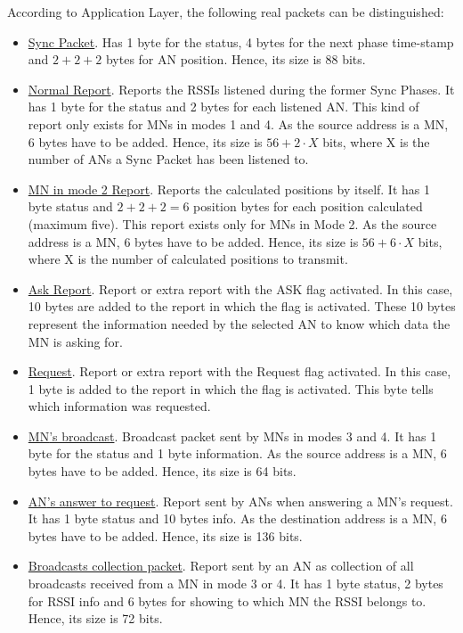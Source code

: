 According to Application Layer, the following real packets can be distinguished:
\begin{itemize}
 \item \underline{Sync Packet}. Has 1 byte for the status, 4 bytes for the next phase time-stamp and $2 + 2 + 2$ bytes for \ac{AN} position. 
Hence, its size is 88 bits.
 
 \item \underline{Normal Report}. Reports the \acp{RSSI} listened during the former Sync Phases. It has 1 byte for the status and 2 bytes 
for each listened \ac{AN}. This kind of report only exists for \acp{MN} in modes 1 and 4. As the source address is a \ac{MN}, 6 bytes have to be added.
Hence, its size is $56 + 2\cdot X$ bits, where X is the number of \acp{AN} a Sync Packet has been listened to.

 \item \underline{\ac{MN} in mode 2 Report}. Reports the calculated positions by itself. It has 1 byte status and $2 + 2 + 2 = 6$ position 
bytes for each position calculated (maximum five). This report exists only for \acp{MN} in Mode 2. As the source address is a \ac{MN}, 6 bytes 
have to be added. Hence, its size is $56 + 6\cdot X$ bits, where X is the number of calculated positions to transmit.

 \item \underline{Ask Report}. Report or extra report with the ASK flag activated. In this case, 10 bytes are added to the report in which the
flag is activated. These 10 bytes represent the information needed by the selected \ac{AN} to know which data the \ac{MN} is asking for.

 \item \underline{Request}. Report or extra report with the Request flag activated. In this case, 1 byte is added to the report in which the
flag is activated. This byte tells which information was requested.

 \item \underline{\ac{MN}'s broadcast}. Broadcast packet sent by \acp{MN} in modes 3 and 4. It has 1 byte for the status and 1 byte information.
As the source address is a \ac{MN}, 6 bytes have to be added. Hence, its size is 64 bits.

 \item \underline{\ac{AN}'s answer to request}. Report sent by \acp{AN} when answering a \ac{MN}'s request. It has 1 byte status and 10 bytes info.
As the destination address is a \ac{MN}, 6 bytes have to be added. Hence, its size is 136 bits.

 \item \underline{Broadcasts collection packet}. Report sent by an \ac{AN} as collection of all broadcasts received from a \ac{MN} in mode 3 
or 4. It has 1 byte status, 2 bytes for \ac{RSSI} info and 6 bytes for showing to which \ac{MN} the \ac{RSSI} belongs to. Hence, its size is 72 bits.
\end{itemize}


